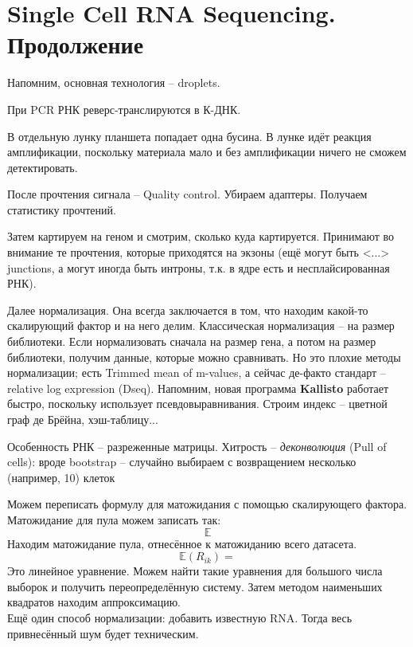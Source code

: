 \documentclass[main.tex]{subfiles}
\begin{document}
\section{Single Cell RNA Sequencing. Продолжение}

Напомним, основная технология -- droplets.

При PCR РНК реверс-транслируются в К-ДНК.

В отдельную лунку планшета попадает одна бусина.
В лунке идёт реакция амплификации, поскольку материала мало и без амплификации ничего не сможем детектировать.

После прочтения сигнала -- Quality control.
Убираем адаптеры.
Получаем статистику прочтений.

Затем картируем на геном и смотрим, сколько куда картируется.
Принимают во внимание те прочтения, которые приходятся на экзоны (ещё могут быть <...> junctions, а могут иногда быть интроны, т.к. в ядре есть и несплайсированная РНК).

Далее нормализация.
Она всегда заключается в том, что находим какой-то скалирующий фактор и на него делим.
Классическая нормализация -- на размер библиотеки.
Если нормализовать сначала на размер гена, а потом на размер библиотеки, получим данные, которые можно сравнивать.
Но это плохие методы нормализации; есть Trimmed mean of m-values,  а сейчас де-факто стандарт -- relative log expression (Dseq).
Напомним, новая программа \textbf{Kallisto} работает быстро, поскольку использует псевдовыравнивания. Строим индекс -- цветной граф де Брёйна, хэш-таблицу... %

Особенность РНК -- разреженные матрицы.
 Хитрость -- \emph{деконволюция} (Pull of cells): вроде bootstrap -- случайно выбираем с возвращением несколько (например, 10) клеток
 
 
 Можем переписать формулу для матожидания с помощью скалирующего фактора.
 Матожидание для пула можем записать так:
 \[ \mathds E \] %
 Находим матожидание пула, отнесённое к матожиданию всего датасета.
 \[ \mathds E (R_{ik}) =  \] %
 Это линейное уравнение.
 Можем найти такие уравнения для большого числа выборок и получить переопределённую систему.
 Затем методом наименьших квадратов находим аппроксимацию. \\
 
 Ещё один способ нормализации: добавить известную RNA.
 Тогда весь привнесённый шум будет техническим. \\
 
\end{document}
